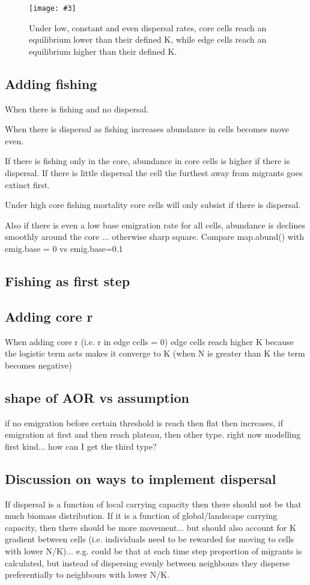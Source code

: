 \documentclass{article}
\newcommand{\capnow}{}
\newcommand{\addcenterfig}[3][Caption to be completed]{
  \begin{figure}[!h]
    \begin{center}
      \texttt{[image: \#3]}
     \caption{#1 \label{#2}}
    \end{center}
  \end{figure}
}
\begin{document}
\renewcommand{\capnow}{Under low, constant and even dispersal rates,
  core cells reach an equilibrium lower than their defined
  K, while edge cells reach an equilibrium higher than their defined K.}
\addcenterfig[\capnow]{even-low-disp}{Theo-mod_range-contrxn_emigbase-01_emigmax-01_habtype-core}

\subsection{Adding fishing}
When there is fishing and no dispersal.

When there is dispersal as fishing increases abundance in cells
becomes move even.

If there is fishing only in the core, abundance in core cells is
higher if there is dispersal.
If there is little dispersal the cell the furthest away from migrants
goes extinct first.

Under high core fishing mortality core cells will only subsist if
there is dispersal.

Also if there is even a low base emigration rate for all cells,
abundance is declines smoothly around the core ... otherwise sharp
square. Compare map.abund() with emig.base = 0 vs emig.base=0.1
\subsection{Fishing as first step}
\subsection{Adding core r}
When adding core r (i.e. r in edge cells = 0) edge cells reach higher
K because the logistic term acts makes it converge to K (when N is
greater than K the term becomes negative)

\subsection{shape of AOR vs assumption}
if no emigration before certain threshold is reach then flat then
increases, if emigration at first and then reach plateau, then other
type. right now modelling first kind... how can I get the third type?

\subsection{Discussion on ways to implement dispersal}
If dispersal is a function of local carrying capacity then there
should not be that much biomass distribution. If it is a function of
global/landscape carrying capacity, then there should be more
movement... but should also account for K gradient between cells
(i.e. individuals need to be rewarded for moving to cells with lower
N/K)... e.g. could be that at each time step proportion of migrants is
calculated, but instead of dispersing evenly between neighbours they
disperse preferentially to neighbours with lower N/K.
\end{document}
